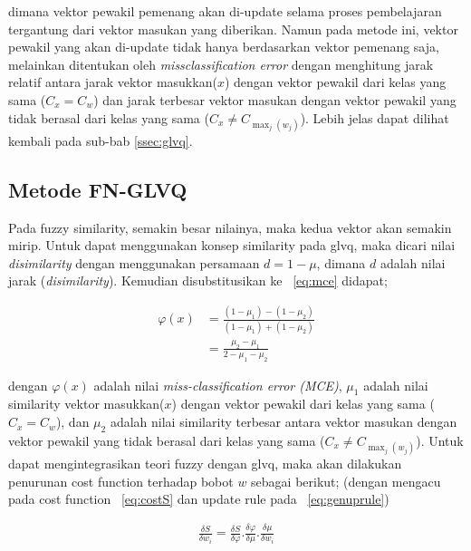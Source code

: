 dimana vektor pewakil pemenang akan di-update selama proses pembelajaran 
tergantung dari vektor masukan yang diberikan. Namun pada metode ini, vektor
pewakil yang akan di-update tidak hanya berdasarkan vektor pemenang saja,
melainkan ditentukan oleh \emph{missclassification error} dengan menghitung
jarak relatif antara jarak vektor masukkan($x$) dengan vektor pewakil dari
kelas yang sama ($C_x = C_w$) dan jarak terbesar vektor masukan dengan vektor
pewakil yang tidak berasal dari kelas yang sama ($C_x \neq C_{\max_{j}(w_j)}$).
Lebih jelas dapat dilihat kembali pada sub-bab \ref{ssec:glvq}.

\subsection{Metode FN-GLVQ}
Pada fuzzy similarity, semakin besar nilainya, maka kedua vektor akan semakin
mirip. Untuk dapat menggunakan konsep similarity pada \gls{glvq}, maka dicari
nilai \emph{disimilarity}  dengan menggunakan persamaan $d = 1 - \mu$, dimana
$d$ adalah nilai jarak (\emph{disimilarity}). Kemudian disubstitusikan ke
\equ~\ref{eq:mce} didapat;

\begin{align}
\label{eq:}
	\varphi(x) &= \frac{(1 - \mu_1) - (1 - \mu_2)}{(1 - \mu_1) + (1 -
	\mu_2)}\nonumber\\
	&= \frac{\mu_2 - \mu_1}{2 - \mu_1 - \mu_2}
\end{align}

dengan $\varphi(x)$ adalah nilai \emph{miss-classification error (MCE)},
$\mu_1$ adalah nilai similarity vektor masukkan($x$) dengan vektor pewakil dari
kelas yang sama ($C_x = C_w$), dan $\mu_2$ adalah nilai similarity
terbesar antara vektor masukan dengan vektor pewakil yang tidak berasal dari
kelas yang sama ($C_x \neq C_{\max_{j}(w_j)}$).  Untuk dapat mengintegrasikan
teori fuzzy dengan \gls{glvq}, maka akan dilakukan penurunan  cost function
terhadap bobot $w$ sebagai berikut; (dengan mengacu pada cost function
\equ~\ref{eq:costS} dan update rule pada \equ~\ref{eq:genuprule})

\begin{align}
\label{eq:turunancostS}
	\frac{\delta S}{\delta w_i} =  
	\frac{\delta S}{\delta \varphi} . \frac{\delta \varphi}{\delta \mu}.
	\frac{\delta \mu}{\delta w_i}
\end{align}


